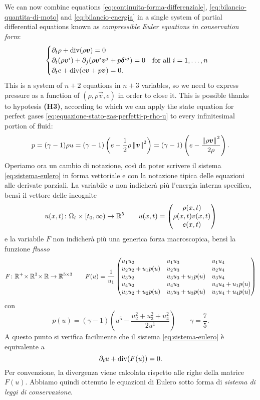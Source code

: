 We can now combine equations \eqref{eq:continuita-forma-differenziale},
\eqref{eq:bilancio-quantita-di-moto} and \eqref{eq:bilancio-energia}
in a single system of partial differential equations known as
\emph{compressible Euler equations in conservation form}:
\begin{equation} \label{eq:sistema-eulero}
\begin{cases}
\partial_t \rho + \operatorname{div}(\rho \bm{v}) = 0 \\
\partial_t (\rho \bm{v}^i)
	+ \partial_j (\rho \bm{v}^i \bm{v}^j + p\bm{\delta}^{ij})
	= 0 \quad \text{for all $i = 1,\dots,n$} \\
\partial_t e + \operatorname{div}(e \bm{v} + p \bm{v}) = 0.
\end{cases}
\end{equation}
This is a system of $n+2$ equations in $n+3$ variables, so we need
to express pressure as a function of $(\rho,\rho\vec{v},e)$ in order to close it.
This is possible thanks to hypotesis \textbf{(H3)}, according to which
we can apply the state equation for perfect gases
\eqref{eq:equazione-stato-gas-perfetti-p-rho-u} to every infinitesimal
portion of fluid:
\[
p
= (\gamma-1) \rho u
= (\gamma-1) \left( e - \frac{1}{2} \rho \left\lVert\bm{v}\right\rVert^2 \right)
= (\gamma-1) \left( e - \frac{\left\lVert\rho \bm{v}\right\rVert^2}{2\rho} \right).
\]
Operiamo ora un cambio di notazione, così da poter
scrivere il sistema \eqref{eq:sistema-eulero} in forma vettoriale e
con la notazione tipica delle equazioni alle derivate parziali.
La variabile $u$ non indicherà più l'energia interna specifica,
bensì il vettore delle incognite
\[
u(x,t) \colon \Omega_t \times [t_0,\infty) \to \mathbb{R}^5
\qquad u(x,t) = \begin{pmatrix} \rho(x,t) \\ \rho(x,t) v(x,t) \\ e(x,t) \end{pmatrix}
\]
e la variabile $F$ non indicherà più una generica forza macroscopica,
bensì la funzione \emph{flusso}
\[
F \colon \R^+ \! \times \R^3 \! \times \R \to \R^{5 \times 3}
\qquad
F(u) =
\frac{1}{u_1}
\begin{pmatrix*}[l]
u_1 u_2            & u_1 u_3            & u_1 u_4            \\
u_2 u_2 + u_1 p(u) & u_2 u_3            & u_2 u_4            \\
u_3 u_2            & u_3 u_3 + u_1 p(u) & u_3 u_4            \\
u_4 u_2            & u_4 u_3            & u_4 u_4 + u_1 p(u) \\
u_5 u_2 + u_2 p(u) & u_5 u_3 + u_3 p(u) & u_5 u_4 + u_4 p(u)
\end{pmatrix*}
\]
con
\begin{equation*}
p(u) = (\gamma-1) \left( u^5 - \frac{u_2^2+u_3^2+u_4^2}{2 u^1} \right)
\qquad \gamma = \frac{7}{5}.
\end{equation*}
A questo punto si verifica facilmente che il sistema \eqref{eq:sistema-eulero}
è equivalente a
\[
\partial_t u + \operatorname{div}(F(u)) = 0.
\]
Per convenzione, la divergenza viene calcolata rispetto alle righe
della matrice $F(u)$.
Abbiamo quindi ottenuto le equazioni di Eulero sotto forma di
\emph{sistema di leggi di conservazione}.

